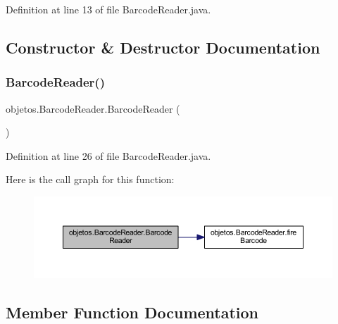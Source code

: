 Definition at line 13 of file Barcode\+Reader.\+java.



\subsection{Constructor \& Destructor Documentation}
\mbox{\label{classobjetos_1_1_barcode_reader_a0dc943983b8313727f52c7e043805a80}} 
\subsubsection{\texorpdfstring{Barcode\+Reader()}{BarcodeReader()}}
{\footnotesize\ttfamily objetos.\+Barcode\+Reader.\+Barcode\+Reader (\begin{DoxyParamCaption}{ }\end{DoxyParamCaption})}



Definition at line 26 of file Barcode\+Reader.\+java.

Here is the call graph for this function\+:
\nopagebreak
\begin{figure}[H]
\begin{center}
\leavevmode
\includegraphics[width=350pt]{classobjetos_1_1_barcode_reader_a0dc943983b8313727f52c7e043805a80_cgraph}
\end{center}
\end{figure}


\subsection{Member Function Documentation}
\mbox{\label{classobjetos_1_1_barcode_reader_a7c0a8f3e684c72a78005c97f3d9cdc24}} 
